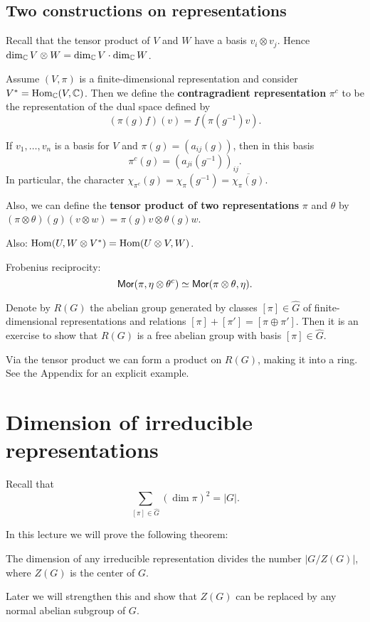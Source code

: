 \documentclass[11pt, english]{article}
\begin{document}
\subsection{Two constructions on representations}

Recall that the tensor product of $V$ and $W$ have a basis $v_i \otimes v_j$. Hence $\dim_{\mathbb{C}} V \otimes W = \dim_{\mathbb{C}} V \cdot \dim_{\mathbb{C}} W$.

Assume $(V,\pi)$ is a finite-dimensional representation and consider $V^\ast = \operatorname{Hom}_{\mathbb{C}}(V,\mathbb{C})$. Then we define the \textbf{contragradient representation} $\pi^c$ to be the representation of the dual space defined by 
$$
(\pi(g)f)(v) = f(\pi(g^{-1})v).
$$

If $v_1,\ldots,v_n$ is a basis for $V$ and $\pi(g)=(a_{ij}(g))$, then in this basis 
$$
\pi^c(g) = (a_{ji}(g^{-1}))_{ij}.
$$
In particular, the character  $\chi_{\pi^c}(g)=\chi_\pi(g^{-1})=\overline{\chi_\pi(g)}$. 

Also, we can define the \textbf{tensor product of two representations} $\pi$ and $\theta$ by $(\pi \otimes \theta)(g)(v \otimes w) = \pi(g)v \otimes \theta(g)w$. 

Also: $\operatorname{Hom}(U, W \otimes V^\ast)= \operatorname{Hom}(U \otimes V, W)$. 

Frobenius reciprocity:
$$
\mathsf{Mor}(\pi, \eta \otimes \theta^c) \simeq \mathsf{Mor}(\pi \otimes \theta, \eta).
$$

Denote by $R(G)$ the abelian group generated by classes $[\pi] \in \widehat G$ of finite-dimensional representations and relations $[\pi]+[\pi'] = [\pi \oplus \pi']$.  Then it is an exercise to show that $R(G)$ is a free abelian group with basis $[\pi] \in \widehat G$.

Via the tensor product we can form a product on $R(G)$, making it into a ring. See the Appendix for an explicit example.

\newpage
\section{Dimension of irreducible representations}

Recall that $$
\sum_{[\pi] \in \widehat G} (\dim \pi)^2 = \lvert G \rvert. $$

In this lecture we will prove the following theorem:

\begin{thm}
\label{thmzg}
 The dimension of any irreducible representation divides the number $\lvert G/Z(G) \rvert$, where $Z(G)$ is the center of $G$. 
\end{thm}
Later we will strengthen this and show that $Z(G)$ can be replaced by any normal abelian subgroup of $G$.
\end{document}
